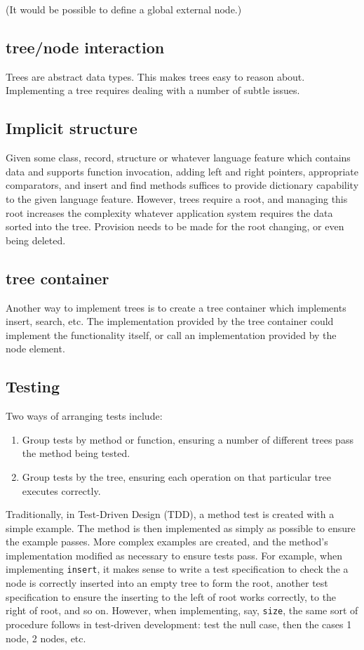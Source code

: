 \documentclass{article}
\begin{document}
(It would be possible to define a global external node.)

\subsection{tree/node interaction}

Trees are abstract data types. This makes trees easy to reason about.
Implementing a tree requires dealing with a number of subtle issues.

\subsection{Implicit structure}

Given some class, record, structure or whatever language feature which contains
data and supports function invocation, adding left and right pointers,
appropriate comparators, and insert and find methods suffices to provide
dictionary capability to the given language feature. However, trees require a
root, and managing this root increases the complexity whatever application
system requires the data sorted into the tree. Provision needs to be made for
the root changing, or even being deleted.

\subsection{tree container}

Another way to implement trees is to create a tree container which implements
insert, search, etc. The implementation provided by the tree container could
implement the functionality itself, or call an implementation provided by
the node element.


\subsection{Testing}

Two ways of arranging tests include:
\begin{enumerate}
\item Group tests by method or function, ensuring a number of different
trees pass the method being tested.
\item Group tests by the tree, ensuring each operation on that particular tree
executes correctly.
\end{enumerate}

Traditionally, in Test-Driven Design (TDD), a method test is created with a simple example.
The method is then implemented as simply as possible to ensure the example passes.
More complex examples are created, and the method's implementation modified as necessary
to ensure tests pass. For example, when implementing {\tt insert}, it makes sense
to write a test specification to check the a node is correctly inserted into an
empty tree to form the root, another test specification to ensure the inserting
to the left of root works correctly, to the right of root, and so on. However,
when implementing, say, {\tt size}, the same sort of procedure follows in test-driven
development: test the null case, then the cases 1 node, 2 nodes, etc.
\end{document}
